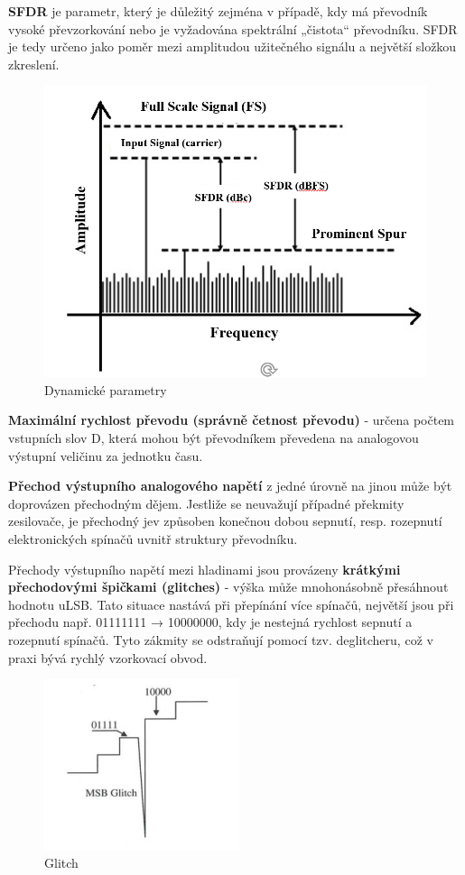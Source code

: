 \textbf{SFDR} je parametr, který je důležitý zejména v případě, kdy má převodník vysoké převzorkování nebo je vyžadována
spektrální „čistota“ převodníku. SFDR je tedy určeno jako poměr mezi amplitudou užitečného signálu a největší složkou zkreslení.

\begin{figure}[h]
   \begin{center}
     \includegraphics[scale=0.5]{images/Dyn.png}
   \end{center}
   \caption{Dynamické parametry}
\end{figure}

\textbf{Maximální rychlost převodu (správně četnost převodu)} - určena počtem vstupních slov D, která mohou být
převodníkem převedena na analogovou výstupní veličinu za jednotku času.

\textbf{Přechod výstupního analogového napětí} z jedné úrovně na jinou může být doprovázen přechodným dějem. Jestliže se neuvažují případné překmity zesilovače, je přechodný jev způsoben konečnou dobou sepnutí, resp. rozepnutí elektronických spínačů uvnitř struktury převodníku.


Přechody výstupního napětí mezi hladinami jsou provázeny \textbf{krátkými přechodovými špičkami (glitches)} -
výška může mnohonásobně přesáhnout hodnotu uLSB. Tato situace nastává při přepínání více spínačů, největší jsou při přechodu např. 01111111 → 10000000, kdy je nestejná rychlost sepnutí a rozepnutí spínačů. Tyto zákmity se odstraňují pomocí tzv. deglitcheru, což v praxi bývá rychlý vzorkovací obvod.
\begin{figure}[h]
   \begin{center}
     \includegraphics[scale=0.6]{images/Glitch.png}
   \end{center}
   \caption{Glitch}
\end{figure}

